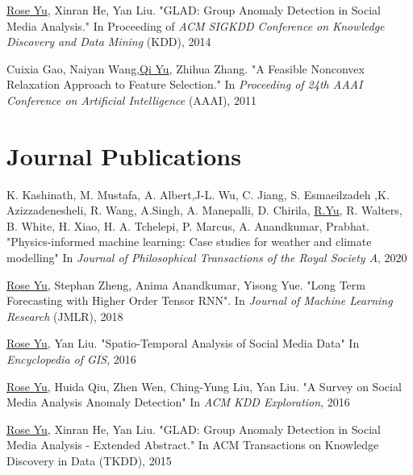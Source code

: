 \documentclass[margin,line]{res}
\begin{document}
\begin{resume}
\begin{enumerate}[label={[C\arabic*]}]
\item \underline{Rose Yu}, Xinran He, Yan Liu. "GLAD: Group Anomaly Detection in Social Media Analysis." In Proceeding of  \textit{ACM SIGKDD Conference on Knowledge Discovery and Data Mining} (KDD), 2014

\item Cuixia Gao, Naiyan Wang,\underline{Qi Yu}, Zhihua Zhang. "A Feasible Nonconvex Relaxation Approach to Feature Selection." In \textit{Proceeding of 24th AAAI Conference on Artificial Intelligence} (AAAI), 2011 

\end{enumerate}

 
\section{\sc Journal Publications}
\begin{enumerate}[label={[J\arabic*]}]
\item K. Kashinath, M. Mustafa, A. Albert,J-L. Wu, C. Jiang, S. Esmaeilzadeh ,K. Azizzadenesheli, R. Wang, A.Singh, A. Manepalli, D. Chirila, \underline{R.Yu}, R. Walters, B. White, H. Xiao, H. A. Tchelepi, P. Marcus, A. Anandkumar,  Prabhat. "Physics-informed machine learning: Case studies for weather and climate modelling" In \textit{Journal of Philosophical Transactions of the Royal Society  A}, 2020

\item \underline{Rose Yu}, Stephan Zheng, Anima Anandkumar, Yisong Yue. "Long Term Forecasting with Higher Order Tensor RNN". In  \textit{ Journal of Machine Learning Research} (JMLR), 2018



\item \underline{Rose Yu},  Yan Liu.  "Spatio-Temporal Analysis of Social Media Data"  In \textit{Encyclopedia of GIS}, 2016

\item \underline{Rose Yu}, Huida Qiu, Zhen Wen, Ching-Yung Liu,  Yan Liu. "A Survey on Social Media Analysis  Anomaly Detection" In \textit{ACM KDD Exploration},  2016

\item \underline{Rose Yu}, Xinran He, Yan Liu. "GLAD: Group Anomaly Detection in Social Media Analysis - Extended Abstract." In \textit{}ACM Transactions on Knowledge Discovery in Data  (TKDD), 2015
\end{enumerate}



\end{resume}
\end{document}
